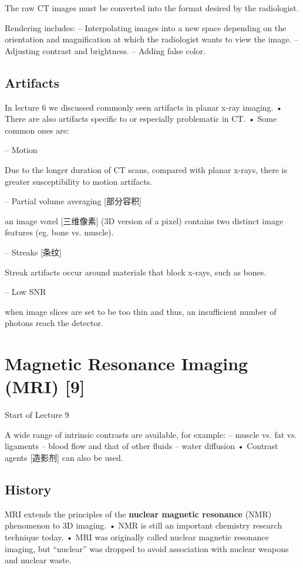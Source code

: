 \documentclass[UTF8,a4paper,11pt]{book}
\theoremstyle{mystyle}{
  \newtheorem{example}{Example}
}
\begin{document}
 The raw CT images must be converted into the
format desired by the radiologist.

Rendering includes:
– Interpolating images into a new space depending
on the orientation and magnification at which the
radiologist wants to view the image.
– Adjusting contrast and brightness.
– Adding false color.

\section{Artifacts}
 In lecture 6 we discussed commonly seen
artifacts in planar x-ray imaging.
• There are also artifacts specific to or especially
problematic in CT.
• Some common ones are:

– Motion

 Due to the longer duration of CT scans,
compared with planar x-rays, there is greater
susceptibility to motion artifacts.

– Partial volume averaging [部分容积]

an image
voxel [三维像素] (3D version of a pixel) contains two
distinct image features (eg. bone vs. muscle).

– Streaks [条纹]

 Streak artifacts occur around materials that
block x-rays, such as bones.


– Low SNR

when image slices are set to
be too thin and thus, an insufficient number
of photons reach the detector.



\chapter{Magnetic Resonance Imaging (MRI) [9]}
{\sf Start of Lecture 9}

 A wide range of intrinsic contrasts are
available, for example:
– muscle vs. fat vs. ligaments
– blood flow and that of other fluids
– water diffusion
• Contrast agents [造影剂] can also be used.


\section{History}
MRI extends the principles of the \textbf{nuclear
magnetic resonance} (NMR) phenomenon to
3D imaging.
• NMR is still an important chemistry research
technique today.
• MRI was originally called nuclear magnetic
resonance imaging, but “nuclear” was
dropped to avoid association with nuclear
weapons and nuclear waste.
\end{document}
